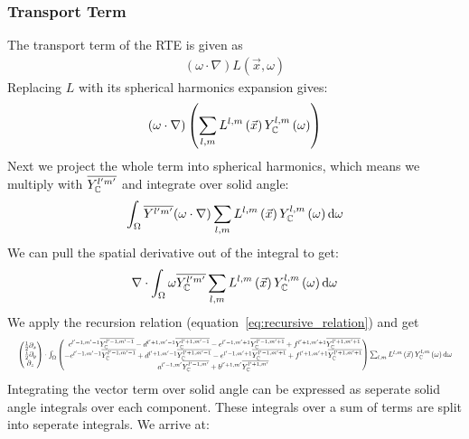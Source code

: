 \subsubsection*{Transport Term}
The transport term of the RTE is given as
\begin{align*}
(\omega\cdot\nabla)L(\vec{x}, \omega)
\end{align*}
Replacing $L$ with its spherical harmonics expansion gives:
\begin{align*}
\left(\omega\cdot\nabla\right)
\left(
\sum_{l,m}
{
L^{l,m}\left(\vec{x}\right )
Y_{\mathbb{C}}^{l,m}\left(\omega\right)
}
\right)
\end{align*}
Next we project the whole term into spherical harmonics, which means we multiply with $\overline{Y_{\mathbb{C}}^{l'm'}}$ and integrate over solid angle:
\begin{align*}
\int_\Omega
{
\overline{Y^{l'm'}}(\omega\cdot\nabla)
\sum_{l,m}
{
L^{l,m}\left(\vec{x}\right)
Y_{\mathbb{C}}^{l,m}\left(\omega\right)
}
}
\,\mathrm{d}\omega
\end{align*}
We can pull the spatial derivative out of the integral to get:
\begin{align*}
\nabla\cdot\int_\Omega
{
\omega\overline{Y_{\mathbb{C}}^{l'm'}}
\sum_{l,m}
{
L^{l,m}\left(\vec{x}\right)
Y_{\mathbb{C}}^{l,m}\left(\omega\right)
}
\,\mathrm{d}\omega
}
\end{align*}
We apply the recursion relation (equation~\ref{eq:recursive_relation}) and get
\begin{equation*}
\resizebox{1.0\hsize}{!}{$
\begin{pmatrix}
\frac{1}{2}\partial_x\\
\frac{i}{2}\partial_y\\
\partial_z
\end{pmatrix}
\cdot
\int_\Omega
\begin{pmatrix}
\ c^{l'-1, m'-1}\overline{\SHBC^{l'-1,m'-1}} - d^{l'+1, m'-1}\overline{\SHBC^{l'+1,m'-1}} - e^{l'-1, m'+1}\overline{\SHBC^{l'-1,m'+1}} + f^{l'+1, m'+1}\overline{\SHBC^{l'+1,m'+1}}\\
-c^{l'-1, m'-1}\overline{\SHBC^{l'-1,m'-1}} + d^{l'+1, m'-1}\overline{\SHBC^{l'+1,m'-1}} - e^{l'-1, m'+1}\overline{\SHBC^{l'-1,m'+1}} + f^{l'+1, m'+1}\overline{\SHBC^{l'+1,m'+1}} \\
a^{l'-1, m'}\overline{\SHBC^{l'-1,m'}}+b^{l'+1, m'}\overline{\SHBC^{l'+1,m'}}
\end{pmatrix}
\sum_{l,m}{
L^{l,m}\left(\vec{x}\right )\SHBC^{l,m}\left(\omega\right)
}
\ud\omega
$}
\end{equation*}
Integrating the vector term over solid angle can be expressed as seperate solid angle integrals over each component. These integrals over a sum of terms are split into seperate integrals. We arrive at:
